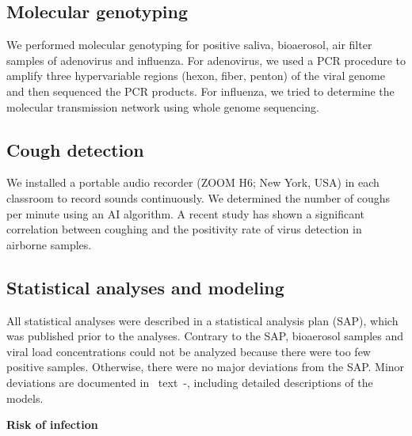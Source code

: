 \documentclass[fleqn,11pt]{wlscirep}
\begin{document}
\subsection*{Molecular genotyping}

We performed molecular genotyping for positive saliva, bioaerosol, air filter samples of adenovirus and influenza. For adenovirus, we used a PCR procedure to amplify three hypervariable regions (hexon, fiber, penton) of the viral genome and then sequenced the PCR products\cite{Akello2021SciRep}. For influenza, we tried to determine the molecular transmission network using whole genome sequencing\cite{Kelly2022FrontiersImmuno}.

\subsection*{Cough detection}

We installed a portable audio recorder (ZOOM H6; New York, USA) in each classroom to record sounds continuously. We determined the number of coughs per minute using an AI algorithm\cite{Bertschinger2023IEEE}. A recent study has shown a significant correlation between coughing and the positivity rate of virus detection in airborne samples\cite{Hanna2023PONE}.

\subsection*{Statistical analyses and modeling}

All statistical analyses were described in a statistical analysis plan (SAP)\cite{Banholzer2023SAP}, which was published prior to the analyses. Contrary to the SAP, bioaerosol samples and viral load concentrations could not be analyzed because there were too few positive samples. Otherwise, there were no major deviations from the SAP. Minor deviations are documented in \supp~text~-, including detailed descriptions of the models. \medskip

\noindent\textbf{Risk of infection} \smallskip
\end{document}
